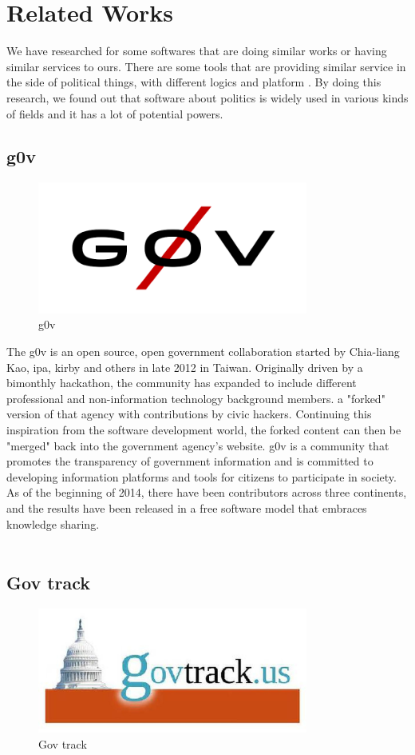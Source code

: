 \documentclass[conference]{IEEEtran}
\begin{document}
\section{Related Works}
We have researched for some softwares that are doing similar works or having similar services to ours. There are some tools that are providing similar service in the side of political things, with  different logics and platform . By doing this research, we found out that software about politics is widely used in various kinds of fields and it has a lot of potential powers. 
 
\subsection{g0v}
  \begin{figure}[htbp]
    \centerline{\includegraphics[width=89mm, scale=0.5]{fig/g0v.png}}
    \caption{g0v}
    \label{fig}
    \end{figure}
The g0v is an open source, open government collaboration started by Chia-liang Kao, ipa, kirby and others in late 2012 in Taiwan. Originally driven by a bimonthly hackathon, the community has expanded to include different professional and non-information technology background members. a "forked" version of that agency with contributions by civic hackers. Continuing this inspiration from the software development world, the forked content can then be "merged" back into the government agency's website. g0v is a community that promotes the transparency of government information and is committed to developing information platforms and tools for citizens to participate in society. As of the beginning of 2014, there have been contributors across three continents, and the results have been released in a free software model that embraces knowledge sharing.
\\
\\
 
\subsection{Gov track}
  \begin{figure}[htbp]
    \centerline{\includegraphics[width=89mm, scale=0.5]{fig/gov_track.jpg}}
    \caption{Gov track}
    \label{fig}
    \end{figure}
    
\end{document}
